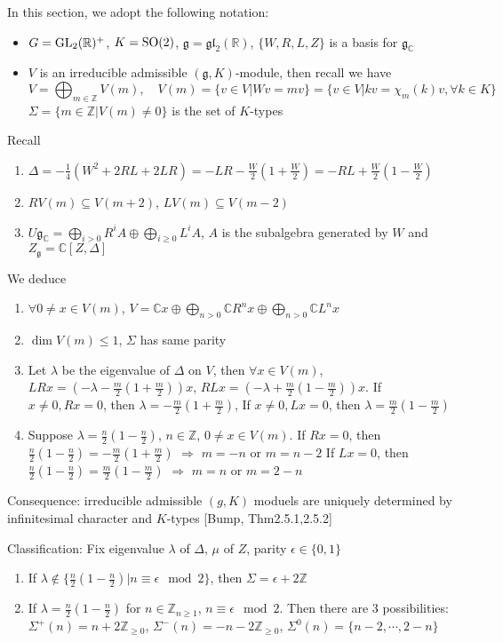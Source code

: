 \documentclass[main]{subfiles}
\begin{document}
In this section, we adopt the following notation:
\begin{itemize}
\item $G=\operatorname{GL}_2(\mathbb R)^+$, $K=\operatorname{SO}(2)$, $\mathfrak g=\mathfrak{gl}_2(\mathbb R)$, $\{W,R,L,Z\}$ is a basis for $\mathfrak g_{\mathbb C}$
\item $V$ is an irreducible admissible $(\mathfrak g,K)$-module, then recall we have
\[V=\bigoplus_{m\in\mathbb Z}V(m),\quad V(m)=\{v\in V|Wv=mv\}=\{v\in V|kv=\chi_m(k)v,\forall k\in K\}\]
$\Sigma=\{m\in\mathbb Z|V(m)\neq0\}$ is the set of $K$-types
\end{itemize}

Recall
\begin{enumerate}
\item $\Delta=-\frac{1}{4}(W^2+2RL+2LR)=-LR-\frac{W}{2}(1+\frac{W}{2})=-RL+\frac{W}{2}(1-\frac{W}{2})$
\item $RV(m)\subseteq V(m+2)$, $LV(m)\subseteq V(m-2)$
\item $U\mathfrak g_{\mathbb C}=\bigoplus_{i>0}R^iA\oplus\bigoplus_{i\geq0}L^iA$, $A$ is the subalgebra generated by $W$ and $Z_{\mathfrak g}=\mathbb C[Z,\Delta]$
\end{enumerate}
We deduce
\begin{enumerate}
\item $\forall 0\neq x\in V(m)$, $V=\mathbb Cx\oplus\bigoplus_{n>0}\mathbb CR^nx\oplus\bigoplus_{n>0}\mathbb CL^nx$
\item $\dim V(m)\leq1$, $\Sigma$ has same parity
\item Let $\lambda$ be the eigenvalue of $\Delta$ on $V$, then $\forall x\in V(m)$, $LRx=(-\lambda-\frac{m}{2}(1+\frac{m}{2}))x$, $RLx=(-\lambda+\frac{m}{2}(1-\frac{m}{2}))x$. If $x\neq0,Rx=0$, then $\lambda=-\frac{m}{2}(1+\frac{m}{2})$, If $x\neq0,Lx=0$, then $\lambda=\frac{m}{2}(1-\frac{m}{2})$
\item Suppose $\lambda=\frac{n}{2}(1-\frac{n}{2})$, $n\in\mathbb Z$, $0\neq x\in V(m)$. If $Rx=0$, then $\frac{n}{2}(1-\frac{n}{2})=-\frac{m}{2}(1+\frac{m}{2})$ $\Rightarrow$ $m=-n$ or $m=n-2$
If $Lx=0$, then $\frac{n}{2}(1-\frac{n}{2})=\frac{m}{2}(1-\frac{m}{2})$ $\Rightarrow$ $m=n$ or $m=2-n$
\end{enumerate}

Consequence: irreducible admissible $(g,K)$ moduels are uniquely determined by infinitesimal character and $K$-types [Bump, Thm2.5.1,2.5.2]

Classification: Fix eigenvalue $\lambda$ of $\Delta$, $\mu$ of $Z$, parity $\epsilon\in\{0,1\}$
\begin{enumerate}
\item If $\lambda\notin\{\frac{n}{2}(1-\frac{n}{2})|n\equiv\epsilon\mod2\}$, then $\Sigma=\epsilon+2\mathbb Z$
\item If $\lambda=\frac{n}{2}(1-\frac{n}{2})$ for $n\in\mathbb Z_{n\geq1}$, $n\equiv\epsilon\mod2$. Then there are 3 possibilities: $\Sigma^+(n)=n+2\mathbb Z_{\geq0}$, $\Sigma^-(n)=-n-2\mathbb Z_{\geq0}$, $\Sigma^0(n)=\{n-2,\cdots,2-n\}$
\end{enumerate}
\end{document}
